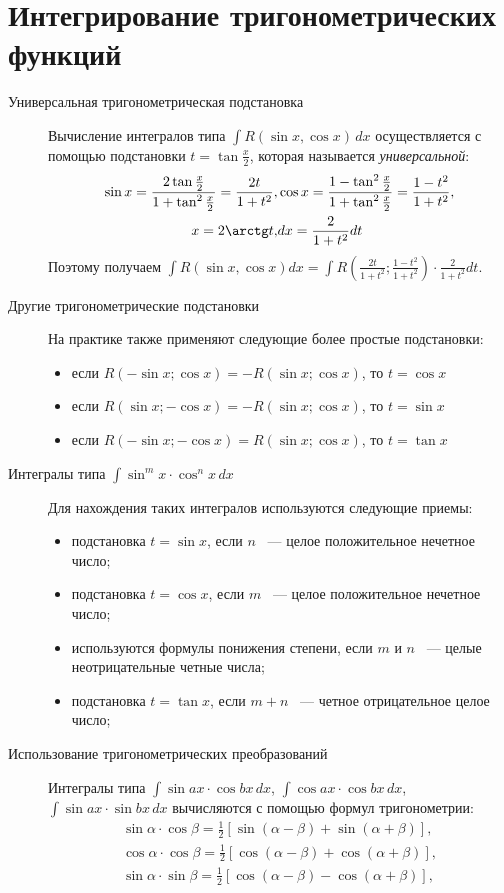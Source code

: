 \documentclass[11pt]{article}
\begin{document}
	\section{Интегрирование тригонометрических функций}
	\begin{description}
		\item[Универсальная тригонометрическая подстановка] Вычисление интегралов типа $\int R(\sin x, \cos x)\, dx$ осуществляется с помощью подстановки $t = \tan\frac{x}{2}$, которая называется \textit{универсальной}:
		\begin{align}
			\sin x = \frac{2\tan\frac{x}{2}}{1 + \tan^2\frac{x}{2}} = \frac{2t}{1 + t^2}, & \cos x = \frac{1 - \tan^2\frac{x}{2}}{1 + \tan^2\frac{x}{2}} = \frac{1 - t^2}{1 + t^2},\\
			x = 2\arctg t, & dx = \frac{2}{1 + t^2} dt
		\end{align}
		Поэтому получаем $\int R(\sin x, \cos x) dx = \int R(\frac{2t}{1 + t^2};\frac{1 - t^2}{1 + t^2})\cdot \frac{2}{1 + t^2}dt$.
		\item[Другие тригонометрические подстановки] На практике также применяют следующие более простые подстановки:
		\begin{itemize}
			\item если $R(-\sin x; \cos x) = -R(\sin x; \cos x)$, то $t = \cos x$
			\item если $R(\sin x; -\cos x) = -R(\sin x; \cos x)$, то $t = \sin x$
			\item если $R(-\sin x; -\cos x) = R(\sin x; \cos x)$, то $t = \tan x$
		\end{itemize}
		\item[Интегралы типа $\int\sin^m x\cdot\cos^n x\, dx$] Для нахождения таких интегралов используются следующие приемы:
		\begin{itemize}
			\item подстановка $t = \sin x$, если $n$ ~--- целое положительное нечетное число;
			\item подстановка $t = \cos x$, если $m$ ~--- целое положительное нечетное число;
			\item используются формулы понижения степени, если $m$ и $n$ ~--- целые неотрицательные четные числа;
			\item подстановка $t = \tan x$, если $m + n$ ~--- четное отрицательное целое число;
		\end{itemize}
		\item[Использование тригонометрических преобразований] Интегралы типа $\int\sin ax\cdot\cos bx\, dx$, $\int\cos ax\cdot\cos bx\, dx$, $\int\sin ax\cdot\sin bx\, dx$ вычисляются с помощью формул тригонометрии:
		\begin{align}
			\sin\alpha\cdot\cos\beta = \frac{1}{2}[\sin (\alpha - \beta) + \sin (\alpha + \beta)],\\
			\cos\alpha\cdot\cos\beta = \frac{1}{2}[\cos (\alpha - \beta) + \cos (\alpha + \beta)],\\
			\sin\alpha\cdot\sin\beta = \frac{1}{2}[\cos (\alpha - \beta) - \cos (\alpha + \beta)],
		\end{align}
	\end{description}
\end{document}
